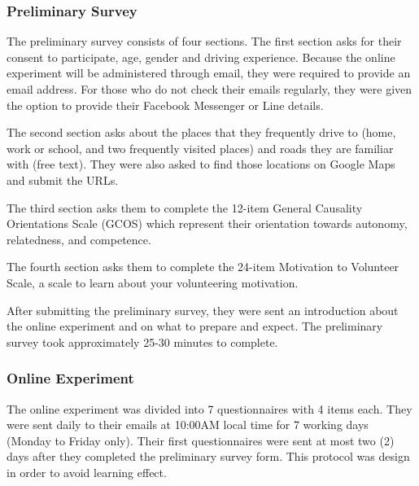 \subsubsection{Preliminary Survey}
The preliminary survey consists of four sections. The first section asks for their consent to participate, age, gender and driving experience. Because the online experiment will be administered through email, they were required to provide an email address. For those who do not check their emails regularly, they were given the option to provide their Facebook Messenger or Line details.

The second section asks about the places that they frequently drive to (home, work or school, and two frequently visited places) and roads they are familiar with (free text). They were also asked to find those locations on Google Maps and submit the URLs. 

The third section asks them to complete the 12-item General Causality Orientations Scale (GCOS) which represent their orientation towards autonomy, relatedness, and competence. 

The fourth section asks them to complete the 24-item Motivation to Volunteer Scale, a scale to learn about your volunteering motivation. 

After submitting the preliminary survey, they were sent an introduction about the online experiment and on what to prepare and expect. The preliminary survey took approximately 25-30 minutes to complete.

\subsubsection{Online Experiment}
The online experiment was divided into 7 questionnaires with 4 items each. They were sent daily to their emails at 10:00AM local time for 7 working days (Monday to Friday only). Their first questionnaires were sent at most two (2) days after they completed the preliminary survey form. This protocol was design in order to avoid learning effect.

